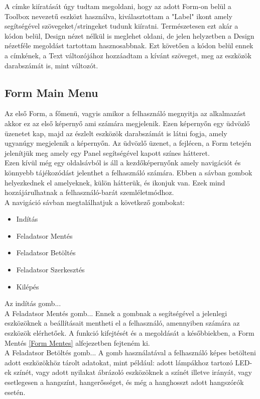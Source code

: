 \documentclass[tocnopagenum]{thesis-ekf}
\theoremstyle{definition}
\theoremstyle{remark}
\begin{document}
	A címke kiíratását úgy tudtam megoldani, hogy az adott Form-on belül a Toolbox nevezetű eszközt használva, kiválasztottam a "Label" ikont amely segítségével szövegeket/stringeket tudunk kiíratni. Természetesen ezt akár a kódon belül, Design nézet nélkül is meglehet oldani, de jelen helyzetben a Design nézetféle megoldást tartottam hasznosabbnak. Ezt követően a kódon belül ennek a címkének, a Text változójához hozzáadtam a kívánt szöveget, meg az eszközök darabszámát is, mint változót.
	\subsection*{Form Main Menu}
	Az első Form, a főmenü, vagyis amikor a felhasználó megnyitja az alkalmazást akkor ez az első képernyő ami számára megjelenik. 
	Ezen képernyőn egy üdvözlő üzenetet kap, majd az észlelt eszközök darabszámát is látni fogja, amely ugyanúgy megjelenik a képernyőn.
	Az üdvözlő üzenet, a fejlécen, a Form tetején jelenítjük meg amely egy Panel segítségével kapott színes hátteret.
	\\
	Ezen kívül még egy oldalsávból is áll a kezdőképernyőnk amely navigációt és könnyebb tájékozódást jelenthet a felhasználó számára.
	Ebben a sávban gombok helyezkednek el amelyeknek, külön hátterük, és ikonjuk van. Ezek mind hozzájárulhatnak a felhasználó-barát szemléletmódhoz.
	\\
	A navigáció sávban megtalálhatjuk a következő gombokat:
	\begin{itemize}
		\item Indítás
		\item Feladatsor Mentés
		\item Feladatsor Betöltés
		\item Feladatsor Szerkesztés
		\item Kilépés
	\end{itemize}
	Az indítás gomb...
	\\
	A Feladatsor Mentés gomb...
	Ennek a gombnak a segítségével a jelenlegi eszközöknek a beállításait mentheti el a felhasználó, amennyiben számára az eszközök elérhetőek. A funkció kifejtését és a megoldását a későbbiekben, a Form Mentés \ref{Form Mentes} alfejezetben fejteném ki.
	\\
	A Feladatsor Betöltés gomb...
	A gomb használatával a felhasználó képes betölteni adott eszközökhöz tárolt adatokat, mint például: adott lámpákhoz tartozó LED-ek színét, vagy adott nyilakat ábrázoló eszközöknek a színét illetve irányát, vagy esetlegesen a hangszínt, hangerősséget, és még a hanghosszt adott hangszórók esetén.
\end{document}

